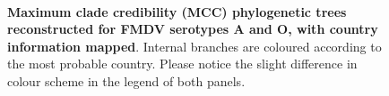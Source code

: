 \documentclass[10pt]{article}
\begin{document}
\newpage

\begin{figure}[!ht]
\begin{center}
\\
\end{center}
\caption{\textbf{Maximum clade credibility (MCC) phylogenetic trees reconstructed for FMDV serotypes A and O, with country information mapped}. 
Internal branches are coloured according to the most probable country.
Please notice the slight difference in colour scheme in the legend of both panels.
}
\label{fig:trees}
\end{figure}
\end{document}
